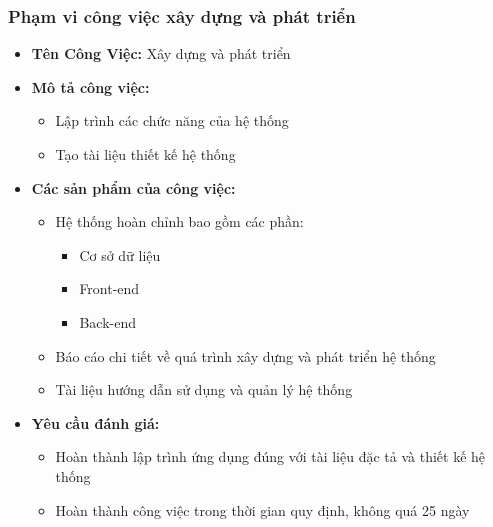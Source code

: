 \subsubsection{Phạm vi công việc xây dựng và phát triển}
\begin{itemize}
    \item \textbf{Tên Công Việc:} Xây dựng và phát triển
    \item \textbf{Mô tả công việc:}
    \begin{itemize}
        \item Lập trình các chức năng của hệ thống
        \item Tạo tài liệu thiết kế hệ thống
    \end{itemize}
    \item \textbf{Các sản phẩm của công việc:}
    \begin{itemize}
        \item Hệ thống hoàn chỉnh bao gồm các phần:
        \begin{itemize}
            \item Cơ sở dữ liệu
            \item Front-end
            \item Back-end
        \end{itemize}
        \item Báo cáo chi tiết về quá trình xây dựng và phát triển hệ thống
        \item Tài liệu hướng dẫn sử dụng và quản lý hệ thống
    \end{itemize}
    \item \textbf{Yêu cầu đánh giá:}
    \begin{itemize}
        \item Hoàn thành lập trình ứng dụng đúng với tài liệu đặc tả và thiết kế hệ thống
        \item Hoàn thành công việc trong thời gian quy định, không quá 25 ngày
    \end{itemize}
\end{itemize}

